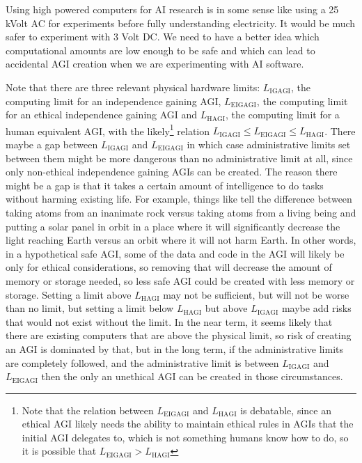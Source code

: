 \documentclass[letterpaper,twocolumn]{article}
\begin{document}
Using high powered computers for AI research is in some sense like
using a 25 kVolt AC for experiments before fully understanding
electricity. It would be much safer to experiment with 3 Volt DC. We
need to have a better idea which computational amounts are low enough
to be safe and which can lead to accidental AGI creation when we are
experimenting with AI software.

Note that there are three relevant physical hardware limits:
$L_\text{IGAGI}$, the computing limit for an independence gaining AGI,
$L_\text{EIGAGI}$, the computing limit for an ethical independence
gaining AGI and $L_\text{HAGI}$, the computing limit for a human
equivalent AGI, with the likely\footnote{Note that the relation
between $L_\text{EIGAGI}$ and $L_\text{HAGI}$ is debatable, since an
ethical AGI likely needs the ability to maintain ethical rules in AGIs
that the initial AGI delegates to, which is not something humans know
how to do, so it is possible that $L_\text{EIGAGI} > L_\text{HAGI}$}
relation $L_\text{IGAGI} \le L_\text{EIGAGI} \le L_\text{HAGI}$.
There maybe a gap between $L_\text{IGAGI}$ and $L_\text{EIGAGI}$ in
which case administrative limits set between them might be more
dangerous than no administrative limit at all, since only non-ethical
independence gaining AGIs can be created.  The reason there might be a
gap is that it takes a certain amount of intelligence to do tasks
without harming existing life. For example, things like tell the
difference between taking atoms from an inanimate rock versus taking
atoms from a living being and putting a solar panel in orbit in a
place where it will significantly decrease the light reaching Earth
versus an orbit where it will not harm Earth. In other words, in a
hypothetical safe AGI, some of the data and code in the AGI will
likely be only for ethical considerations, so removing that will
decrease the amount of memory or storage needed, so less safe AGI
could be created with less memory or storage.  Setting a limit above
$L_\text{HAGI}$ may not be sufficient, but will not be worse than no
limit, but setting a limit below $L_\text{HAGI}$ but above
$L_\text{IGAGI}$ maybe add risks that would not exist without the
limit. In the near term, it seems likely that there are existing
computers that are above the physical limit, so risk of creating an
AGI is dominated by that, but in the long term, if the administrative
limits are completely followed, and the administrative limit is
between $L_\text{IGAGI}$ and $L_\text{EIGAGI}$ then the only an
unethical AGI can be created in those circumstances.
\end{document}
